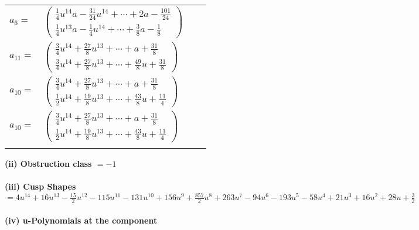 \documentclass[1p]{elsarticle_modified}
\theoremstyle{definition}
\begin{document}
\begin{tabular}{m{7pt} m{180pt} m{7pt} m{180pt} }
\flushright $a_{6}=$&$\begin{pmatrix}\frac{1}{4} u^{14} a-\frac{31}{24} u^{14}+\cdots+2 a-\frac{101}{24}\\\frac{1}{4} u^{13} a-\frac{1}{4} u^{14}+\cdots+\frac{3}{8} a-\frac{1}{8}\end{pmatrix}$ \\
\flushright $a_{11}=$&$\begin{pmatrix}\frac{3}{4} u^{14}+\frac{27}{8} u^{13}+\cdots+a+\frac{31}{8}\\\frac{3}{4} u^{14}+\frac{27}{8} u^{13}+\cdots+\frac{49}{8} u+\frac{31}{8}\end{pmatrix}$ \\
\flushright $a_{10}=$&$\begin{pmatrix}\frac{3}{4} u^{14}+\frac{27}{8} u^{13}+\cdots+a+\frac{31}{8}\\\frac{1}{2} u^{14}+\frac{19}{8} u^{13}+\cdots+\frac{43}{8} u+\frac{11}{4}\end{pmatrix}$\\ \flushright $a_{10}=$&$\begin{pmatrix}\frac{3}{4} u^{14}+\frac{27}{8} u^{13}+\cdots+a+\frac{31}{8}\\\frac{1}{2} u^{14}+\frac{19}{8} u^{13}+\cdots+\frac{43}{8} u+\frac{11}{4}\end{pmatrix}$\\&\end{tabular}
\flushleft \textbf{(ii) Obstruction class $= -1$}\\~\\
\flushleft \textbf{(iii) Cusp Shapes $= 4 u^{14}+16 u^{13}-\frac{15}{2} u^{12}-115 u^{11}-131 u^{10}+156 u^9+\frac{857}{2} u^8+263 u^7-94 u^6-193 u^5-58 u^4+21 u^3+16 u^2+28 u+\frac{3}{2}$}\\~\\
\newpage\renewcommand{\arraystretch}{1}
\flushleft \textbf{(iv) u-Polynomials at the component}\newline \\
\end{document}
